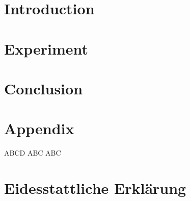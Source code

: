 \documentclass[a4paper,12pt,oneside]{article}
\begin{document}
    
    \begin{abstract}
    
    \end{abstract}
    
    \newpage
    
    \tableofcontents
    
    \newpage
    \pagestyle{fancy} %
    
    
    \listoffigures
    \newpage
    
    \listoftables
    \newpage
    
  
    
    \section{Introduction}\label{introduction}  
     
    \newpage

    \section{Experiment}
    
    \newpage
    
    \section{Conclusion}\label{conclusion}  
     
    
    
    \newpage
    \setcounter{section}{0} %
    \renewcommand*\thesection{\Alph{section}} %
    \section{Appendix}\label{appendix}
    
        ABCD
    \newpage
        ABC
    \newpage
        ABC
    \newpage
    
    
    \pagestyle{empty}
    \section{Eidesstattliche Erklärung}
    
\end{document}
